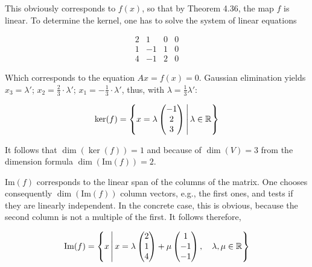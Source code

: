 This obviously corresponds to \(f(x)\), so that by Theorem 4.36, the map \(f\) is linear. To determine the kernel, one has to solve the system of linear equations

\[
    \begin{array}{cccc}
    2 & 1 & 0 & 0 \\
    1 & -1 & 1 & 0 \\
    4 & -1 & 2 & 0
    \end{array}
\]

Which corresponds to the equation \(Ax = f(x) = 0\). Gaussian 
elimination yields \(x_3 = \lambda'\); 
\(x_2 = \frac{2}{3} \cdot \lambda'\); \(x_1 = -\frac{1}{3} \cdot \lambda'\), 
thus, with \(\lambda = \frac{1}{3} \lambda'\):

\[
    \ker(f) =
    \left\{
    x = \lambda
    \begin{pmatrix}
    -1 \\
    2 \\
    3
    \end{pmatrix}
    \, \middle| \, \lambda \in \mathbb{R}
    \right\}
\]

It follows that \(\dim(\ker(f)) = 1\) and because of \(\dim(V) = 3\) from the dimension 
formula \(\dim(\text{Im}(f)) = 2\). 
\vspace{\baselineskip}

\(\text{Im}(f)\) corresponds to the linear span of the columns of the matrix. One chooses consequently 
\(\dim(\text{Im}(f))\) column vectors, e.g., the first ones, and tests if they are linearly independent. 
In the concrete case, this is obvious, because the second column is 
not a multiple of the first. It follows therefore,

\[
    \text{Im}(f) =
    \left\{
    x \, \middle| \, x = \lambda
    \begin{pmatrix}
    2 \\
    1 \\
    4
    \end{pmatrix} + \mu
    \begin{pmatrix}
    1 \\
    -1 \\
    -1
    \end{pmatrix}
    , \quad \lambda, \mu \in \mathbb{R}
    \right\}
\]

